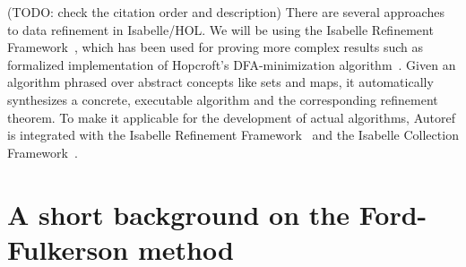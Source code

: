 \documentclass{llncs}
\begin{document}
(TODO: check the citation order and description) There are several approaches to data refinement in Isabelle/HOL. We will be using the Isabelle Refinement Framework~\cite{LaTu12,La12}, which has been used for proving more complex results such as formalized implementation of Hopcroft’s DFA-minimization algorithm~\cite{LaTu12}. Given an algorithm phrased over abstract concepts like sets and maps, it automatically synthesizes a concrete, executable algorithm and the corresponding refinement theorem. To make it applicable for the development of actual algorithms, Autoref is integrated with the Isabelle Refinement Framework~\cite{La12} and the Isabelle Collection Framework~\cite{LL10}.


\section{A short background on the Ford-Fulkerson method}
%       
%   
% 
%         
%   
%   
%   
%   
%   
\end{document}
